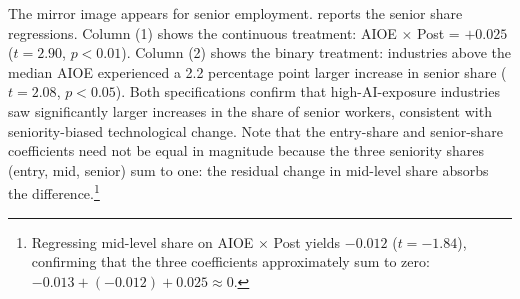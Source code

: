 \documentclass[12pt]{article}
\begin{document}
The mirror image appears for senior employment.  reports the senior share regressions. Column (1) shows the continuous treatment: AIOE $\times$ Post = $+0.025$ ($t = 2.90$, $p < 0.01$). Column (2) shows the binary treatment: industries above the median AIOE experienced a 2.2 percentage point larger increase in senior share ($t = 2.08$, $p < 0.05$). Both specifications confirm that high-AI-exposure industries saw significantly larger increases in the share of senior workers, consistent with seniority-biased technological change. Note that the entry-share and senior-share coefficients need not be equal in magnitude because the three seniority shares (entry, mid, senior) sum to one: the residual change in mid-level share absorbs the difference.\footnote{Regressing mid-level share on AIOE $\times$ Post yields $-0.012$ ($t = -1.84$), confirming that the three coefficients approximately sum to zero: $-0.013 + (-0.012) + 0.025 \approx 0$.}
\end{document}
